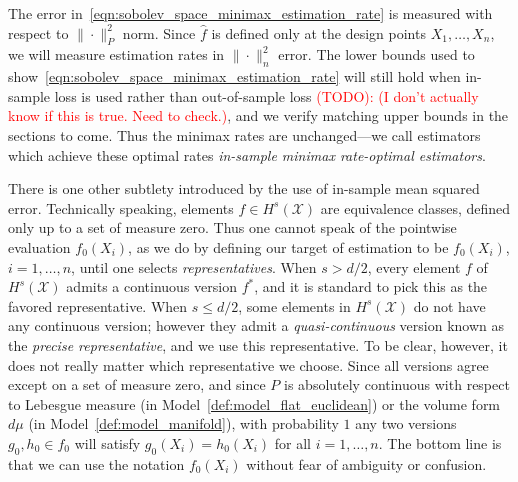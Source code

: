 \documentclass{article}
\newcommand{\1}{\mathbf{1}}
\newcommand{\mc}[1]{\mathcal{#1}}
\newcommand{\wh}[1]{\widehat{#1}}
\theoremstyle{alden}
\theoremstyle{aldenthm}
\theoremstyle{definition}
\theoremstyle{remark}
\begin{document}
The error in~\eqref{eqn:sobolev_space_minimax_estimation_rate} is measured with respect to $\|\cdot\|_P^2$ norm. Since $\wh{f}$ is defined only at the design points $X_1,\ldots,X_n$, we will measure estimation rates in $\|\cdot\|_n^2$ error. The lower bounds used to show~\eqref{eqn:sobolev_space_minimax_estimation_rate} will still hold when in-sample loss is used rather than out-of-sample loss \textcolor{red}{(TODO): (I don't actually know if this is true. Need to check.)}, and we verify matching upper bounds in the sections to come. Thus the minimax rates are unchanged---we call estimators which achieve these optimal rates \emph{in-sample minimax rate-optimal estimators}.

There is one other subtlety introduced by the use of in-sample mean squared error. Technically speaking, elements $f \in H^s(\mc{X})$ are equivalence classes, defined only up to a set of measure zero. Thus one cannot speak of the pointwise evaluation $f_0(X_i)$, as we do by defining our target of estimation to be $f_0(X_i)$, $i=1,\ldots,n$, until one selects \emph{representatives}. When $s > d/2$, every element $f$ of $H^s(\mc{X})$ admits a continuous version $f^{\ast}$, and it is standard to pick this as the favored representative. When $s \leq d/2$, some elements in $H^s(\mc{X})$ do not have any continuous version; however they admit a \emph{quasi-continuous} version \citep{evans15} known as the \emph{precise representative}, and we use this representative. To be clear, however, it does not really matter which representative we choose. Since all versions agree except on a set of measure zero, and since $P$ is absolutely continuous with respect to Lebesgue measure (in Model~\ref{def:model_flat_euclidean}) or the volume form $d\mu$ (in Model~\ref{def:model_manifold}), with probability $1$ any two versions $g_0, h_0 \in f_0$ will satisfy $g_0(X_i) = h_0(X_i)$ for all $i = 1,\ldots,n$. The bottom line is that we can use the notation $f_0(X_i)$ without fear of ambiguity or confusion.

\end{document}
